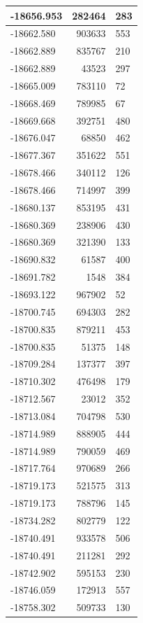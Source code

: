 \documentclass[]{book}
\theoremstyle{definition}
\theoremstyle{definition}
\theoremstyle{definition}
\theoremstyle{remark}
\begin{document}
\begin{tabular}{l|r|l}
\hline
-18656.953 & 282464 & 283\\
\hline
-18662.580 & 903633 & 553\\
\hline
-18662.889 & 835767 & 210\\
\hline
-18662.889 & 43523 & 297\\
\hline
-18665.009 & 783110 & 72\\
\hline
-18668.469 & 789985 & 67\\
\hline
-18669.668 & 392751 & 480\\
\hline
-18676.047 & 68850 & 462\\
\hline
-18677.367 & 351622 & 551\\
\hline
-18678.466 & 340112 & 126\\
\hline
-18678.466 & 714997 & 399\\
\hline
-18680.137 & 853195 & 431\\
\hline
-18680.369 & 238906 & 430\\
\hline
-18680.369 & 321390 & 133\\
\hline
-18690.832 & 61587 & 400\\
\hline
-18691.782 & 1548 & 384\\
\hline
-18693.122 & 967902 & 52\\
\hline
-18700.745 & 694303 & 282\\
\hline
-18700.835 & 879211 & 453\\
\hline
-18700.835 & 51375 & 148\\
\hline
-18709.284 & 137377 & 397\\
\hline
-18710.302 & 476498 & 179\\
\hline
-18712.567 & 23012 & 352\\
\hline
-18713.084 & 704798 & 530\\
\hline
-18714.989 & 888905 & 444\\
\hline
-18714.989 & 790059 & 469\\
\hline
-18717.764 & 970689 & 266\\
\hline
-18719.173 & 521575 & 313\\
\hline
-18719.173 & 788796 & 145\\
\hline
-18734.282 & 802779 & 122\\
\hline
-18740.491 & 933578 & 506\\
\hline
-18740.491 & 211281 & 292\\
\hline
-18742.902 & 595153 & 230\\
\hline
-18746.059 & 172913 & 557\\
\hline
-18758.302 & 509733 & 130\\

\end{tabular}
\end{document}
